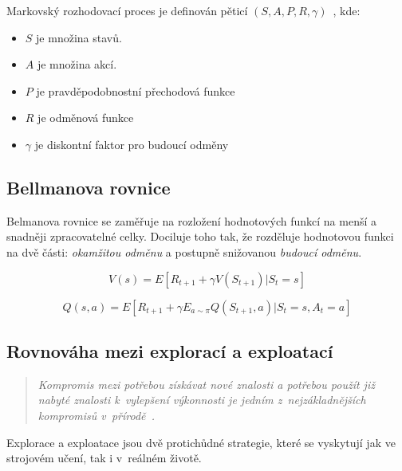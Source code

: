 \begin{definition}
  
Markovský rozhodovací proces je definován pěticí $(S, A, P, R, \gamma)$~\cite{RL_basics}, kde:

\begin{itemize}
\item $S$ je množina stavů.
\item $A$ je množina akcí.
\item $P$ je pravděpodobnostní přechodová funkce
\item $R$ je odměnová funkce
\item $\gamma$ je diskontní faktor pro budoucí odměny
\end{itemize}
\end{definition}

\subsection{Bellmanova rovnice}\label{subsec:bellmanova-rovnice}

Belmanova rovnice se zaměřuje na rozložení hodnotových funkcí na menší a snadněji zpracovatelné celky.
Dociluje toho tak, že rozděluje hodnotovou funkci na dvě části: \emph{okamžitou odměnu} a postupně snižovanou \emph{budoucí odměnu}.

\begin{equation}
  V(s) = E[R_{t+1} + \gamma V(S_{t+1}) | S_t = s]\label{eq:bellman1}
\end{equation}

\begin{equation}
  Q(s, a) = E[R_{t+1} + \gamma E_{a\sim\pi}Q(S_{t+1}, a) | S_t = s, A_t = a]\label{eq:bellman2}
\end{equation}



\subsection{Rovnováha mezi explorací a exploatací}
\label{subsec:exploration-exploitation-dillemma}
\begin{quote}
  \emph{Kompromis mezi potřebou získávat nové znalosti a potřebou použít již nabyté znalosti k~vylepšení výkonnosti je jedním z~nejzákladnějších kompromisů v~přírodě~\cite{Exploitation_Exploration}.}
\end{quote}
Explorace a exploatace jsou dvě protichůdné strategie, které se vyskytují jak ve strojovém učení, tak i v~reálném životě.

